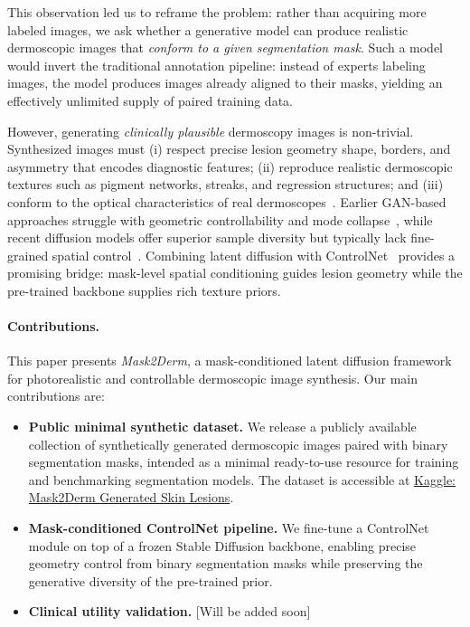 This observation led us to reframe the problem: rather than acquiring more labeled
images, we ask whether a generative model can produce realistic dermoscopic images
that \emph{conform to a given segmentation mask}. Such a model would invert the
traditional annotation pipeline: instead of experts labeling images, the model
produces images already aligned to their masks, yielding an effectively unlimited
supply of paired training data.

However, generating \emph{clinically plausible} dermoscopy images is non-trivial. 
Synthesized images must (i) respect precise lesion geometry shape, borders, and 
asymmetry that encodes diagnostic features; (ii) reproduce realistic dermoscopic 
textures such as pigment networks, streaks, and regression structures; and (iii) 
conform to the optical characteristics of real dermoscopes~\cite{Tschandl2018HAM10000}. Earlier
GAN-based approaches struggle with geometric controllability and mode
collapse~\cite{qasim2021redganattackingclassimbalance}, while recent diffusion models offer superior sample diversity
but typically lack fine-grained spatial control~\cite{SheJun_DiDGen_MICCAI2025,xu2025skindualgen}. Combining latent 
diffusion with ControlNet~\cite{zhang2023adding} provides a promising bridge: 
mask-level spatial conditioning guides lesion geometry while the pre-trained 
backbone supplies rich texture priors.
\paragraph{Contributions.}
This paper presents \textit{Mask2Derm}, a mask-conditioned latent diffusion framework for photorealistic and controllable dermoscopic image synthesis. Our main contributions are:

\begin{itemize}[leftmargin=1.5em]
    \item \textbf{Public minimal synthetic dataset.} We release a publicly available collection of synthetically generated dermoscopic images paired with binary segmentation masks, intended as a minimal ready-to-use resource for training and benchmarking segmentation models. The dataset is accessible at \href{https://www.kaggle.com/datasets/rollas/mask2derm-generated-skin-lesions}{Kaggle: Mask2Derm Generated Skin Lesions}.
    \item \textbf{Mask-conditioned ControlNet pipeline.} We fine-tune a ControlNet module on top of a frozen Stable Diffusion backbone, enabling precise geometry control from binary segmentation masks while preserving the generative diversity of the pre-trained prior.
    \item \textbf{Clinical utility validation.} [Will be added soon]
\end{itemize}
